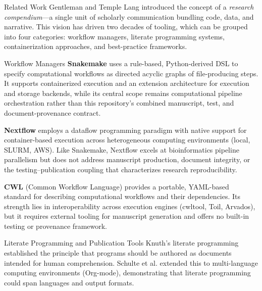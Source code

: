 \documentclass[
  ignorenonframetext,
]{beamer}
\begin{document}
\begin{frame}{Related Work}
\protect{}\label{related-work}
Gentleman and Temple Lang  introduced the
concept of a \emph{research compendium}---a single unit of scholarly
communication bundling code, data, and narrative. This vision has driven
two decades of tooling, which can be grouped into four categories:
workflow managers, literate programming systems, containerization
approaches, and best-practice frameworks.

\begin{block}{Workflow Managers}
\protect{}\label{workflow-managers}
\textbf{Snakemake}  uses a rule-based,
Python-derived DSL to specify computational workflows as directed
acyclic graphs of file-producing steps. It supports containerized
execution and an extension architecture for execution and storage
backends, while its central scope remains computational pipeline
orchestration rather than this repository's combined manuscript, test,
and document-provenance contract.

\textbf{Nextflow}  employs a dataflow
programming paradigm with native support for container-based execution
across heterogeneous computing environments (local, SLURM, AWS). Like
Snakemake, Nextflow excels at bioinformatics pipeline parallelism but
does not address manuscript production, document integrity, or the
testing--publication coupling that characterizes research
reproducibility.

\textbf{CWL} (Common Workflow Language)  provides a
portable, YAML-based standard for describing computational workflows and
their dependencies. Its strength lies in interoperability across
execution engines (cwltool, Toil, Arvados), but it requires external
tooling for manuscript generation and offers no built-in testing or
provenance framework.
\end{block}

\begin{block}{Literate Programming and Publication Tools}
\protect{}\label{literate-programming-and-publication-tools}
Knuth's literate programming  established the
principle that programs should be authored as documents intended for
human comprehension. Schulte et al. 
extended this to multi-language computing environments (Org-mode),
demonstrating that literate programming could span languages and output
formats.


\end{block}
\end{frame}
\end{document}
